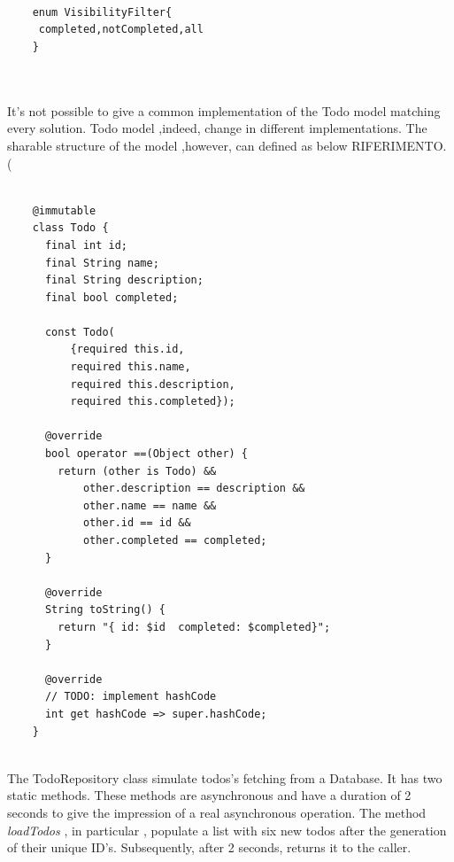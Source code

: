 	\mbox{}\\
\begin{code}	
	 \mbox{}\\
			\label{code:2.3}

	\begin{verbatim}
	
	enum VisibilityFilter{
	 completed,notCompleted,all
	}
	
	
	\end{verbatim}
	\end{code}
	\mbox{}
	
It's not possible to give a common implementation of the Todo model matching every solution. Todo model ,indeed, change in different implementations. The sharable structure of the model ,however, can defined as below RIFERIMENTO. (
	\mbox{}\\
	\begin{code}
	
	 \mbox{}
\label{code:2.4}
	\begin{verbatim}
	
	@immutable
	class Todo {
	  final int id;
	  final String name;
	  final String description;
	  final bool completed;
	
	  const Todo(
	      {required this.id,
	      required this.name,
	      required this.description,
	      required this.completed});
	
	  @override
	  bool operator ==(Object other) {
	    return (other is Todo) &&
	        other.description == description &&
	        other.name == name &&
	        other.id == id &&
	        other.completed == completed;
	  }
	
	  @override
	  String toString() {
	    return "{ id: $id  completed: $completed}";
	  }
	
	  @override
	  // TODO: implement hashCode
	  int get hashCode => super.hashCode;
	}
	
	\end{verbatim}
	\end{code}
	\mbox{}
	
	
The TodoRepository class simulate todos's fetching from a Database. It has two static methods. These methods are asynchronous and have a duration of 2 seconds to give the impression of a real asynchronous operation. The method \textit{loadTodos} , in particular , populate a list with six new todos after the generation of their unique ID's. Subsequently, after 2 seconds, returns it to the caller.
	
